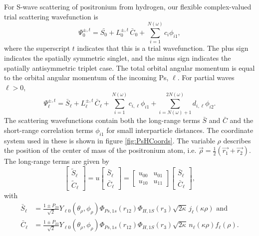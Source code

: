 \documentclass[preprint,showpacs,preprintnumbers,amsmath,amssymb]{revtex4}
\begin{document}
For S-wave scattering of positronium from hydrogen, our flexible complex-valued trial scattering wavefunction is
\begin{equation}
\Psi_0^{\pm,t} = \bar{S_0} + L_0^{\pm,t} \, \bar{C}_0 + \sum_{i=1}^{N(\omega)} c_i \phi_{i1},
\label{eq:TrialWave}
\end{equation}
where the superscript $t$ indicates that this is a trial wavefunction. The plus sign indicates the spatially symmetric singlet, and the minus sign indicates the spatially antisymmetric triplet case. The total orbital angular momentum is equal to the orbital angular momentum of the incoming Ps, $\ell$. For partial waves $\ell > 0$,
\begin{equation}
\Psi_\ell^{\pm,t} = \bar{S}_\ell + L^{\pm,t}_\ell \, \bar{C}_\ell + \sum_{i=1}^{N(\omega)} c_{i,\ell} \phi_{i1} + \!\!\!\sum_{i=N(\omega)+1}^{2N(\omega)} \!\! d_{i,\ell} \phi_{i2}.
\label{eq:TrialWaveHigher}
\end{equation}
The scattering wavefunctions contain both the long-range terms $\bar{S}$ and $\bar{C}$ and the short-range correlation terms $\phi_{i1}$ for small interparticle distances. The coordinate system used in these is shown in figure \ref{fig:PsHCoords}. The variable $\rho$ describes the position of the center of mass of the positronium atom, i.e. $\vec{\rho} = \frac{1}{2}\left(\vec{r_1} + \vec{r_2}\right)$. The long-range terms are given by
\begin{equation}
\label{eq:SCPhiDef}
\begin{bmatrix}
\widetilde{S}_\ell \\ \widetilde{C}_\ell
\end{bmatrix} = u  \begin{bmatrix}
\bar{S}_\ell \\ \bar{C}_\ell
\end{bmatrix} = \begin{bmatrix}
u_{00} & u_{01} \\  u_{10} & u_{11}
\end{bmatrix}
\begin{bmatrix}
\bar{S}_\ell \\ \bar{C}_\ell
\end{bmatrix}, 
\end{equation}
with
\begin{subequations}
\label{eq:SCBarPhiDef}
\begin{align}
\bar{S}_\ell &= \frac{1\pm P_{23}}{\sqrt{2}}Y_{\ell 0}(\theta_\rho,\phi_\rho)\Phi_{Ps,1s}\left(r_{12}\right) \Phi_{H,1S}\left(r_3\right) \sqrt{2\kappa} \,j_\ell\left(\kappa\rho\right) \text{ and} \label{eq:SBar} \\
\bar{C}_\ell &= \frac{1\pm P_{23}}{\sqrt{2}}Y_{\ell 0}(\theta_\rho,\phi_\rho)\Phi_{Ps,1s}\left(r_{12}\right) \Phi_{H,1S}\left(r_3\right) \sqrt{2\kappa} \,n_\ell\left(\kappa\rho\right) f_\ell(\rho). \label{eq:CBar}
\end{align}
\end{subequations}
\end{document}
